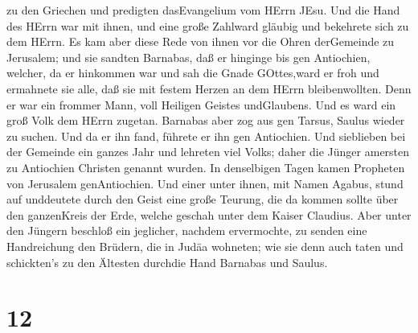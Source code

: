 zu den Griechen und predigten dasEvangelium vom HErrn JEsu.
 Und die Hand des HErrn war mit ihnen, und eine große
Zahlward gläubig und bekehrete sich zu dem HErrn.  Es kam
aber diese Rede von ihnen vor die Ohren derGemeinde zu Jerusalem; und
sie sandten Barnabas, daß er hinginge bis gen Antiochien, 
welcher, da er hinkommen war und sah die Gnade GOttes,ward er froh und
ermahnete sie alle, daß sie mit festem Herzen an dem HErrn
bleibenwollten.  Denn er war ein frommer Mann, voll
Heiligen Geistes undGlaubens. Und es ward ein groß Volk dem HErrn
zugetan.  Barnabas aber zog aus gen Tarsus, Saulus wieder
zu suchen.  Und da er ihn fand, führete er ihn gen
Antiochien. Und sieblieben bei der Gemeinde ein ganzes Jahr und lehreten
viel Volks; daher die Jünger amersten zu Antiochien Christen genannt
wurden.  In denselbigen Tagen kamen Propheten von Jerusalem
genAntiochien.  Und einer unter ihnen, mit Namen Agabus,
stund auf unddeutete durch den Geist eine große Teurung, die da kommen
sollte über den ganzenKreis der Erde, welche geschah unter dem Kaiser
Claudius.  Aber unter den Jüngern beschloß ein jeglicher,
nachdem ervermochte, zu senden eine Handreichung den Brüdern, die in
Judäa wohneten;  wie sie denn auch taten und schickten's zu
den Ältesten durchdie Hand Barnabas und Saulus.

\hypertarget{section-11}{%
\section{12}\label{section-11}}

